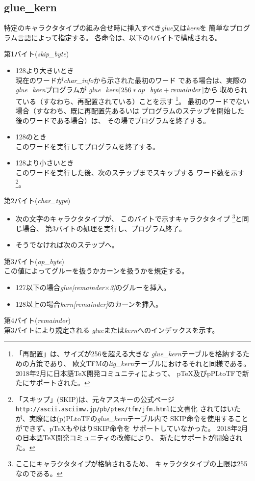 \documentclass[a4paper,11pt,nomag]{jsarticle}
\begin{document}
\subsection{glue\_kern}
特定のキャラクタタイプの組み合せ時に挿入すべき{\it glue}又は{\it kern}を
簡単なプログラム言語によって指定する。
各命令は、以下の4バイトで構成される。
\begin{description}
\item{第1バイト({\it skip\_byte})}
	\begin{itemize}
	\item 128より大きいとき\\
		現在のワードが{\it char\_info}から示された最初のワード
		である場合は、実際の{\it glue\_kern}プログラムが
		{\it glue\_kern}[$256*{\it op\_byte}+{\it remainder}$]から
		収められている（すなわち、再配置されている）ことを示す
		\footnote{「再配置」は、サイズが256を超える大きな
		{\it glue\_kern}テーブルを格納するための方策であり、
		欧文TFMの{\it lig\_kern}テーブルにおけるそれと同様である。
		2018年2月に日本語\TeX{}開発コミュニティによって、
		p\TeX{}及びpPLtoTFで新たにサポートされた。}。
		最初のワードでない場合（すなわち、既に再配置先あるいは
		プログラムのステップを開始した後のワードである場合）は、
		その場でプログラムを終了する。
	\item 128のとき\\
		このワードを実行してプログラムを終了する。
	\item 128より小さいとき\\
		このワードを実行した後、次のステップまでスキップする
		ワード数を示す
		\footnote{「スキップ」(SKIP)は、元々アスキーの公式ページ
		{\tt http://ascii.asciimw.jp/pb/ptex/tfm/jfm.html}に文書化
		されてはいたが、実際には(p)PLtoTFの{\it glue\_kern}テーブル内で
		SKIP命令を使用することができず、p\TeX{}もやはりSKIP命令を
		サポートしていなかった。
		2018年2月の日本語\TeX{}開発コミュニティの改修により、
		新たにサポートが開始された。}。
	\end{itemize}
\item{第2バイト({\it char\_type})}
	\begin{itemize}
	\item 次の文字のキャラクタタイプが、
		このバイトで示すキャラクタタイプ
		\footnote{ここにキャラクタタイプが格納されるため、
		キャラクタタイプの上限は255なのである。}と同じ場合、
		第3バイトの処理を実行し、プログラム終了。
	\item そうでなければ次のステップへ。
	\end{itemize}
\item{第3バイト({\it op\_byte})}\\
	この値によってグルーを扱うかカーンを扱うかを規定する。
	\begin{itemize}
	\item 127以下の場合{\it glue[remainder$\times$3]}のグルーを挿入。
	\item 128以上の場合{\it kern[remainder]}のカーンを挿入。
	\end{itemize}
\item{第4バイト({\it remainder})}\\
	第3バイトにより規定される
	{\it glue}または{\it kern}へのインデックスを示す。
\end{description}
%
\end{document}
